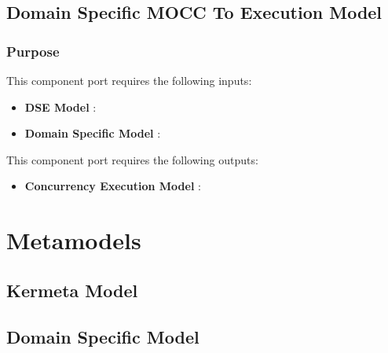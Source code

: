 \documentclass{gemoc} %
\begin{document}


\subsection{Domain Specific MOCC To Execution Model}


\subsubsection{Purpose}

This component port requires the following inputs:
\begin{itemize}
  \item \textbf{DSE Model} :
  \item \textbf{Domain Specific Model} :
\end{itemize}

This component port requires the following outputs:
\begin{itemize}
  \item \textbf{Concurrency Execution Model} :
\end{itemize}

\section{Metamodels}
\subsection{Kermeta Model}


\subsection{Domain Specific Model}

\end{document}
